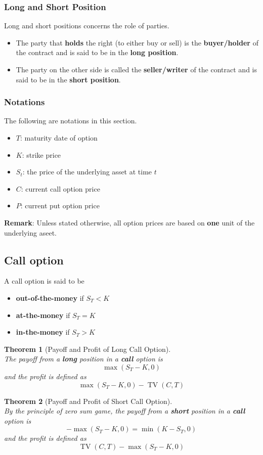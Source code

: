 \documentclass[12pt]{article}
\newtheorem{theorem}{Theorem}[section]
\theoremstyle{definition}
\DeclareMathOperator{\TV}{TV}
\begin{document}
\subsubsection{Long and Short Position}
Long and short positions concerns the role of parties.
\begin{itemize}
  \item The party that \textbf{holds} the right (to either buy or sell) is the \textbf{buyer/holder} of the contract and is said to be in the \textbf{long position}.
  \item The party on the other side is called the \textbf{seller/writer} of the contract and is said to be in the \textbf{short position}.
\end{itemize}
\subsubsection{Notations}
The following are notations in this section.
\begin{itemize}
\item $T$: maturity date of option
\item $K$: strike price
\item $S_t$: the price of the underlying asset at time $t$
\item $C$: current call option price
\item $P$: current put option price
\end{itemize}
\textbf{Remark}: Unless stated otherwise, all option prices are based on \textbf{one} unit of the underlying aseet.
\subsection{Call option}
A call option is said to be
\begin{itemize}
  \item \textbf{out-of-the-money} if $S_T<K$
  \item \textbf{at-the-money} if $S_T=K$
  \item \textbf{in-the-money} if $S_T>K$
\end{itemize}
\begin{theorem}[Payoff and Profit of Long Call Option]
\hfill\\\normalfont The payoff from a \textbf{long} position in a \textbf{call} option is
\[
\max(S_T-K,0)
\]
and the profit is defined as
\[
\max(S_T-K,0)-\TV(C,T)
\]
\end{theorem}
\begin{theorem}[Payoff and Profit of Short Call Option]
\hfill\\\normalfont By the principle of zero sum game, the payoff from a \textbf{short} position in a \textbf{call} option is
\[
-\max(S_T-K,0)=\min(K-S_T,0)
\]
and the profit is defined as
\[
\TV(C,T)-\max(S_T-K,0)
\]
\end{theorem}
\end{document}
